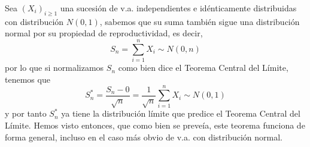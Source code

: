 \begin{ejemplo}
    Sea $(X_i)_{i\geq 1}$ una sucesión de v.a. independientes e idénticamente distribuidas con distribución $N(0,1)$, sabemos que su suma también sigue una distribución normal por su propiedad de reproductividad, es decir,
    \begin{equation*}
        S_n = \sum_{i=1}^n X_i \sim N(0,n)
    \end{equation*}
    por lo que si normalizamos $S_n$ como bien dice el Teorema Central del Límite, tenemos que
    \begin{equation*}
        S_n^* = \dfrac{S_n - 0}{\sqrt{n}} = \dfrac{1}{\sqrt{n}} \sum_{i=1}^n X_i \sim N(0,1)
    \end{equation*}
    y por tanto $S_n^*$ ya tiene la distribución límite que predice el Teorema Central del Límite. Hemos visto entonces, que como bien se preveía, este teorema funciona de forma general, incluso en el caso más obvio de v.a. con distribución normal.
\end{ejemplo}

